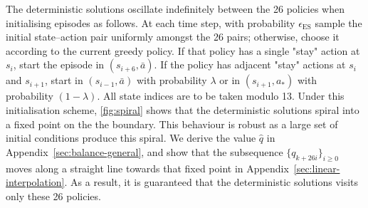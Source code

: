 \documentclass{article}
\begin{document}

The deterministic solutions oscillate indefinitely between the 26 policies when initialising episodes as follows.
At each time step, with probability $\epsilon_{\mathrm{ES}}$ sample the initial state–action pair uniformly amongst the 26 pairs;
otherwise, choose it according to the current greedy policy.
If that policy has a single "stay" action at $s_i$, start the episode in $(s_{i+6}, \bar a)$.
If the policy has adjacent "stay" actions at $s_i$ and $s_{i+1}$, start in $(s_{i-1}, \bar a)$ with probability $\lambda$ or in $(s_{i+1}, a_*)$ with probability $(1-\lambda)$.
All state indices are to be taken modulo 13.
Under this initialisation scheme, 
\autoref{fig:spiral} shows that the deterministic solutions spiral into a fixed point on the the boundary.
This behaviour is robust as a large set of initial conditions produce this spiral.
We derive the value $\widehat q$ in Appendix~\ref{sec:balance-general},
and show that the subsequence $\{q_{k + 26 i}\}_{i \ge 0}$ moves along a straight line towards that fixed point in Appendix~\ref{sec:linear-interpolation}.
As a result, it is guaranteed that the deterministic solutions visits only these 26 policies.




\end{document}
